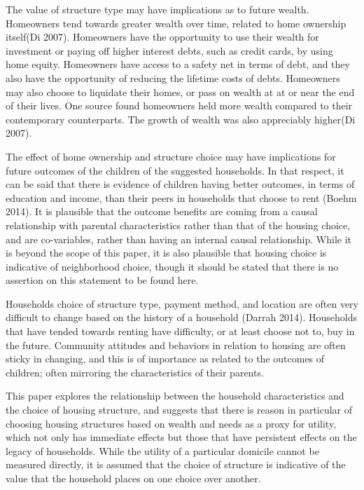 \documentclass{article}
\begin{document}
	The value of structure type may have implications as to future wealth.  Homeowners tend towards greater wealth over time, related to home ownership itself(Di 2007).  Homeowners have the opportunity to use their wealth for investment or paying off higher interest debts, such as credit cards, by using home equity.  Homeowners have access to a safety net in terms of debt, and they also have the opportunity of reducing the lifetime costs of debts.  Homeowners may also choose to liquidate their homes, or pass on wealth at at or near the end of their lives.  One source found homeowners held more wealth compared to their contemporary counterparts.  The growth of wealth was also appreciably higher(Di 2007). 
  
The effect of home ownership and structure choice may have implications for future outcomes of the children of the suggested households.  In that respect, it can be said that there is evidence of children having better outcomes, in terms of education and income, than their peers in households that choose to rent (Boehm 2014).  It is plausible that the outcome benefits are coming from a causal relationship with parental characteristics rather than that of the housing choice, and are co-variables, rather than having an internal causal relationship.  While it is beyond the scope of this paper, it is also plausible that housing choice is indicative of neighborhood choice, though it should be stated that there is no assertion on this statement to be found here.

Households choice of structure type, payment method, and location are often very difficult to change based on the history of a household (Darrah 2014).  Households that have tended towards renting have difficulty, or at least choose not to, buy in the future.  Community attitudes and behaviors in relation to housing are often sticky in changing, and this is of importance as related to the outcomes of children; often mirroring the characteristics of their parents.  

This paper explores the relationship between the household characteristics and the choice of housing structure, and suggests that there is reason in particular of choosing housing structures based on wealth and needs as a proxy for utility, which not only has immediate effects but those that have persistent effects on the legacy of households.  While the utility of a particular domicile cannot be measured directly, it is assumed that the choice of structure is indicative of the value that the household places on one choice over another.  
\end{document}
